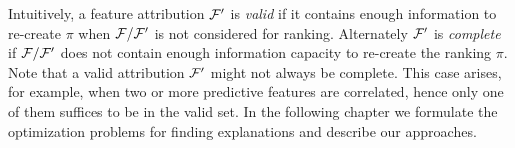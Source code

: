 Intuitively, a feature attribution $\mathcal{F}'$ is \textit{valid} if it contains enough information to re-create $\pi$ when $\mathcal{F} / \mathcal{F}'$ is not considered for ranking.
Alternately $\mathcal{F}'$ is \textit{complete} if $\mathcal{F} / \mathcal{F}'$ does not contain enough information capacity to re-create the ranking $\pi$. Note that a valid attribution $\mathcal{F}'$ might not always be complete. This case arises, for example, when two or more predictive features are correlated, hence only one of them suffices to be in the valid set. In the following chapter we formulate the optimization problems for finding explanations and describe our approaches.









